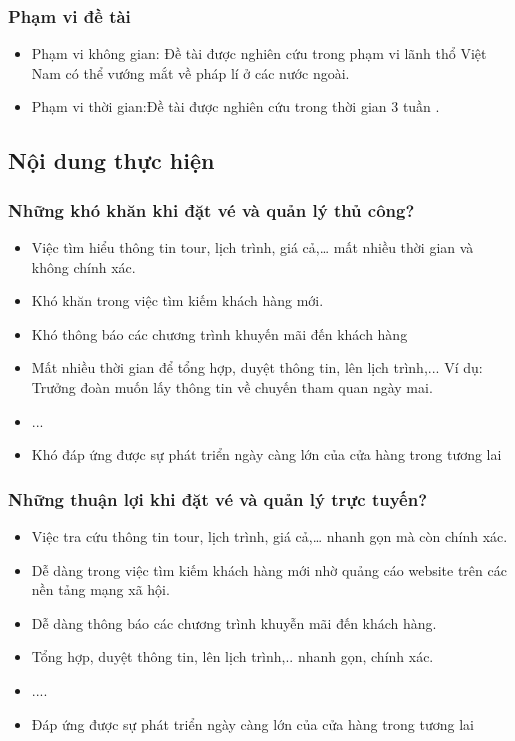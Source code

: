 \subsubsection{Phạm vi đề tài}

\begin{itemize}
\item Phạm vi không gian: Đề tài được nghiên cứu trong phạm vi lãnh thổ Việt Nam có thể vướng mắt về pháp lí ở các nước ngoài.
\item Phạm vi thời gian:Đề tài được nghiên cứu trong thời gian 3 tuần .
\end{itemize}

\subsection{Nội dung thực hiện}

\subsubsection{Những khó khăn khi đặt vé và quản lý thủ công?}

\begin{itemize}
\item Việc tìm hiểu thông tin tour, lịch trình, giá cả,… mất nhiều thời gian và không chính xác.
\item Khó khăn trong việc tìm kiếm khách hàng mới.
\item Khó thông báo các chương trình khuyến mãi đến khách hàng
\item Mất nhiều thời gian để tổng hợp, duyệt thông tin, lên lịch trình,...
Ví dụ: Trưởng đoàn muốn lấy thông tin về chuyến tham quan ngày mai.
\item ...
\item Khó đáp ứng được sự phát triển ngày càng lớn của cửa hàng trong tương lai

\end{itemize}

\subsubsection{Những thuận lợi khi đặt vé và quản lý trực tuyến?}

\begin{itemize}
\item Việc tra cứu thông tin tour, lịch trình, giá cả,… nhanh gọn mà còn chính xác.
\item Dễ dàng trong việc tìm kiếm khách hàng mới nhờ quảng cáo website trên các nền tảng mạng xã hội.
\item Dễ dàng thông báo các chương trình khuyễn mãi đến khách hàng.
\item  Tổng hợp, duyệt thông tin, lên lịch trình,.. nhanh gọn, chính xác.
\item ....
\item Đáp ứng được sự phát triển ngày càng lớn của cửa hàng trong tương lai
\end{itemize}


